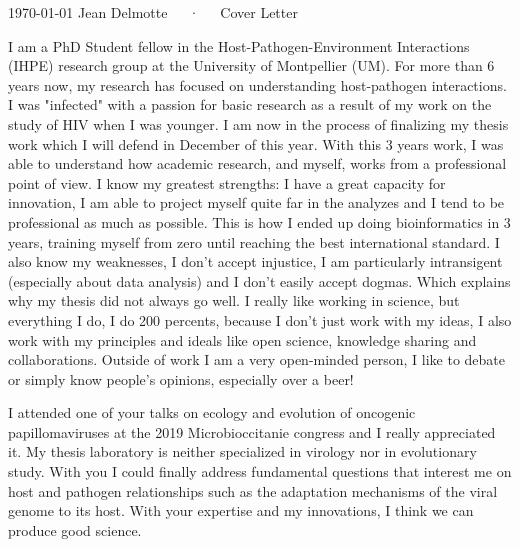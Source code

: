 \documentclass[11pt, a4paper]{awesome-cv}
\begin{document}
\makecvheader[R]

\makecvfooter
  {\today}
  {Jean Delmotte~~~·~~~Cover Letter}
  {\thepage}
\makelettertitle

\begin{cvletter}


I am a PhD Student fellow in the Host-Pathogen-Environment Interactions (IHPE) research group at the University of Montpellier (UM). For more than 6 years now, my research has focused on understanding host-pathogen interactions. I was "infected" with a passion for basic research as a result of my work on the study of HIV when I was younger. I am now in the process of finalizing my thesis work which I will defend in December of this year. With this 3 years work, I was able to understand how academic research, and myself, works from a professional point of view. I know my greatest strengths: I have a great capacity for innovation, I am able to project myself quite far in the analyzes and I tend to be professional as much as possible. This is how I ended up doing bioinformatics in 3 years, training myself from zero until reaching the best international standard. I also know my weaknesses, I don't accept injustice, I am particularly intransigent (especially about data analysis) and I don't easily accept dogmas. Which explains why my thesis did not always go well. I really like working in science, but everything I do, I do 200 percents, because I don't just work with my ideas, I also work with my principles and ideals like open science, knowledge sharing and collaborations. Outside of work I am a very open-minded person, I like to debate or simply know people's opinions, especially over a beer!

I attended one of your talks on ecology and evolution of oncogenic papillomaviruses at the 2019 Microbioccitanie congress and I really appreciated it. My thesis laboratory is neither specialized in virology nor in evolutionary study. With you I could finally address fundamental questions that interest me on host and pathogen relationships such as the adaptation mechanisms of the viral genome to its host. With your expertise and my innovations, I think we can produce good science.


\end{cvletter}
\end{document}

